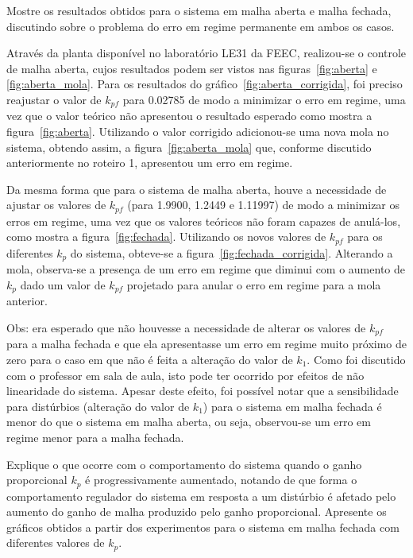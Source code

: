 \documentclass{ZenTera}
\begin{document}
\begin{questions}
\question Mostre os resultados obtidos para o sistema em malha aberta e malha fechada, discutindo sobre o problema do erro em regime permanente em ambos os casos.

    \begin{solution}
        Através da planta disponível no laboratório LE31 da FEEC, realizou-se o controle de malha aberta, cujos resultados podem ser vistos nas figuras~\ref{fig:aberta} e \ref{fig:aberta_mola}. 
        Para os resultados do gráfico~\ref{fig:aberta_corrigida}, foi preciso reajustar o valor de $k_{pf}$ para 0.02785 de modo a minimizar o erro em regime, uma vez que o valor teórico não apresentou o resultado esperado como mostra a figura~\ref{fig:aberta}. 
        Utilizando o valor corrigido adicionou-se uma nova mola no sistema, obtendo assim, a figura~\ref{fig:aberta_mola} que, conforme discutido anteriormente no roteiro 1, apresentou um erro em regime.
        
        Da mesma forma que para o sistema de malha aberta, houve a necessidade de ajustar os valores de $k_{pf}$ (para 1.9900, 1.2449 e 1.11997) de modo a minimizar os erros em regime, uma vez que os valores teóricos não foram capazes de anulá-los, como mostra a figura~\ref{fig:fechada}.
        Utilizando os novos valores de $k_{pf}$ para os diferentes $k_p$ do sistema, obteve-se a figura~\ref{fig:fechada_corrigida}.
        Alterando a mola, observa-se a presença de um erro em regime que diminui com o aumento de $k_p$ dado um valor de $k_{pf}$ projetado para anular o erro em regime para a mola anterior.
        
        Obs: era esperado que não houvesse a necessidade de alterar os valores de $k_{pf}$ para a malha fechada e que ela apresentasse um erro em regime muito próximo de zero para o caso em que não é feita a alteração do valor de $k_1$.
        Como foi discutido com o professor em sala de aula, isto pode ter ocorrido por efeitos de não linearidade do sistema.
        Apesar deste efeito, foi possível notar que a sensibilidade para distúrbios (alteração do valor de $k_1$) para o sistema em malha fechada é menor do que o sistema em malha aberta, ou seja, observou-se um erro em regime menor para a malha fechada. 
    \end{solution}

\question Explique o que ocorre com o comportamento do sistema quando o ganho proporcional $k_p$ é progressivamente aumentado, notando de que forma o comportamento regulador do sistema em resposta a um distúrbio é afetado pelo aumento do ganho de malha produzido pelo ganho proporcional.
Apresente os gráficos obtidos a partir dos experimentos para o sistema em malha fechada com diferentes valores de $k_p$.


\end{questions}
\end{document}
